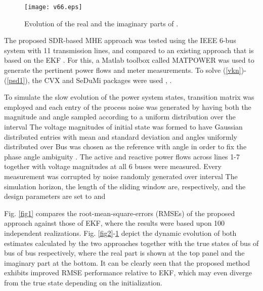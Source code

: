 \documentclass[conference]{IEEEtran}
\begin{document}
 \begin{figure}
\centering
\texttt{[image: v66.eps]}
\caption{Evolution of the real and the imaginary parts of .}
\label{fig4}
\end{figure}



The proposed SDR-based MHE approach was tested using the IEEE 6-bus system with 11 transmission lines, and compared to an existing approach that is based on the EKF \cite{HuS02}. For this, a Matlab toolbox called MATPOWER \cite{tps:thomas2011}
 was used to generate the pertinent power flows and meter measurements. To solve (\ref{vkn})-(\ref{psd1}), the CVX and SeDuMi packages were used \cite{cvx}, \cite{sedumi}.

 To simulate the slow evolution of the power system states, transition matrix  was employed and each entry of the process noise  was generated by having both the magnitude and angle sampled according to a uniform distribution over the interval 
 The voltage magnitudes of initial state  was formed to have Gaussian distributed entries with mean  and standard deviation  and angles uniformly distributed over  Bus  was chosen as the reference with angle  in order to fix the phase angle ambiguity \cite{naps:zhu2011}. The active and reactive power flows across lines 1-7 together with voltage magnitudes at all 6 buses were measured. Every measurement was corrupted by noise randomly generated over interval   The simulation horizon, the length of the sliding window are, respectively,  and the design parameters are set to  and 

Fig. \ref{fig1} compares the root-mean-square-errors (RMSEs) of the proposed approach against those of EKF, where the results were based upon 100 independent realizations. Fig. \ref{fig2}-\ref{fig4} depict the dynamic evolution of both estimates calculated by the two approaches together with the true states  of bus    of bus   of bus  respectively, where the real part is shown at the top panel and the imaginary part at the bottom. It can be clearly seen that the proposed method exhibits improved RMSE performance relative to EKF, which may even diverge from the true state depending on the initialization.
\end{document}

